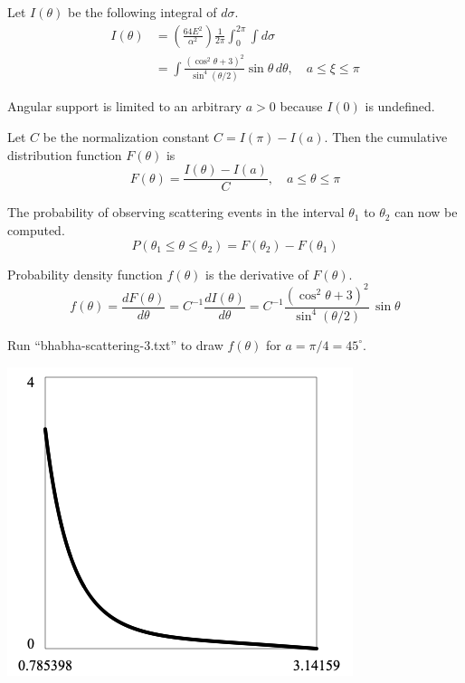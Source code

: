 \documentclass[12pt]{article}
\begin{document}
\bigskip
\noindent
Let $I(\theta)$ be the following integral of $d\sigma$.
\begin{align*}
I(\theta)
&=\left(\frac{64E^2}{\alpha^2}\right)\frac{1}{2\pi}
\int_0^{2\pi}\int d\sigma
\\
&=\int\frac{\left(\cos^2\theta+3\right)^2}{\sin^4(\theta/2)}\sin\theta\,d\theta,
\quad a\le\xi\le\pi
\end{align*}

\noindent
Angular support is limited to an arbitrary $a>0$ because $I(0)$ is undefined.

\bigskip
\noindent
Let $C$ be the normalization constant $C=I(\pi)-I(a)$.
Then the cumulative distribution function $F(\theta)$ is
\begin{equation*}
F(\theta)=\frac{I(\theta)-I(a)}{C},
\quad a\le\theta\le\pi
\end{equation*}

\noindent
The probability of observing scattering events in the interval $\theta_1$ to $\theta_2$
can now be computed.
\begin{equation*}
P(\theta_1\le\theta\le\theta_2)=F(\theta_2)-F(\theta_1)
\end{equation*}

\noindent
Probability density function $f(\theta)$ is the derivative of $F(\theta)$.
\begin{equation*}
f(\theta)=\frac{dF(\theta)}{d\theta}=C^{-1}\frac{dI(\theta)}{d\theta}
=C^{-1}\frac{\left(\cos^2\theta+3\right)^2}{\sin^4(\theta/2)}\,\sin\theta
\end{equation*}

\noindent
Run ``bhabha-scattering-3.txt'' to draw $f(\theta)$ for $a=\pi/4=45^\circ$.

\begin{center}
\includegraphics[scale=0.5]{bhabha-scattering.png}
\end{center}
\end{document}
